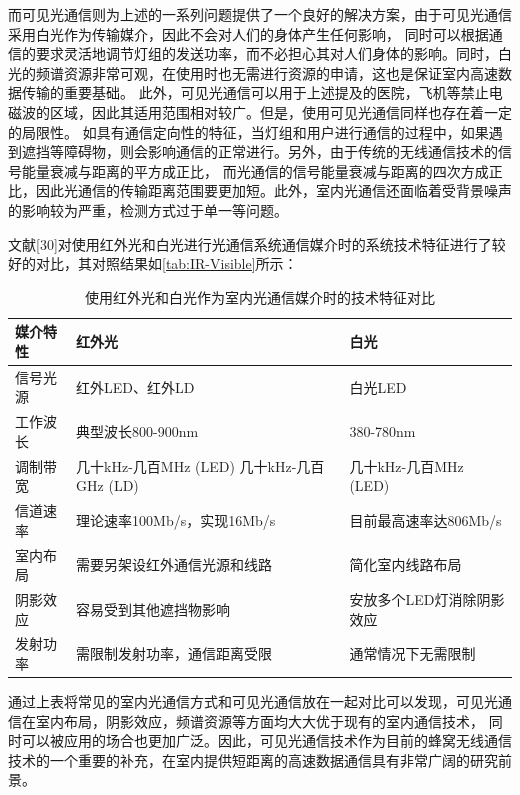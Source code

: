 而可见光通信则为上述的一系列问题提供了一个良好的解决方案，由于可见光通信采用白光作为传输媒介，因此不会对人们的身体产生任何影响，
同时可以根据通信的要求灵活地调节灯组的发送功率，而不必担心其对人们身体的影响。同时，白光的频谱资源非常可观，在使用时也无需进行资源的申请，这也是保证室内高速数据传输的重要基础。
此外，可见光通信可以用于上述提及的医院，飞机等禁止电磁波的区域，因此其适用范围相对较广。但是，使用可见光通信同样也存在着一定的局限性。
如具有通信定向性的特征，当灯组和用户进行通信的过程中，如果遇到遮挡等障碍物，则会影响通信的正常进行。另外，由于传统的无线通信技术的信号能量衰减与距离的平方成正比，
而光通信的信号能量衰减与距离的四次方成正比，因此光通信的传输距离范围要更加短。此外，室内光通信还面临着受背景噪声的影响较为严重，检测方式过于单一等问题。

文献[30]对使用红外光和白光进行光通信系统通信媒介时的系统技术特征进行了较好的对比，其对照结果如\autoref{tab:IR-Visible}所示：

\begin{table}[htbp]
    \caption{使用红外光和白光作为室内光通信媒介时的技术特征对比}
    \label{tab:IR-Visible}
    \centering
    \begin{tabular}{lll}
        \toprule
        媒介特性 & 红外光 & 白光\\
        \midrule
        信号光源 & 红外LED、红外LD & 白光LED \\
        工作波长 & 典型波长800-900nm & 380-780nm \\
        调制带宽 & 几十kHz-几百MHz (LED) 几十kHz-几百GHz (LD) & 几十kHz-几百MHz (LED) \\
        信道速率 & 理论速率100Mb/s，实现16Mb/s & 目前最高速率达806Mb/s \\
        室内布局 & 需要另架设红外通信光源和线路 & 简化室内线路布局 \\
        阴影效应 & 容易受到其他遮挡物影响 & 安放多个LED灯消除阴影效应 \\
        发射功率 & 需限制发射功率，通信距离受限 & 通常情况下无需限制 \\
        \bottomrule
    \end{tabular}
\end{table}

通过上表将常见的室内光通信方式和可见光通信放在一起对比可以发现，可见光通信在室内布局，阴影效应，频谱资源等方面均大大优于现有的室内通信技术，
同时可以被应用的场合也更加广泛。因此，可见光通信技术作为目前的蜂窝无线通信技术的一个重要的补充，在室内提供短距离的高速数据通信具有非常广阔的研究前景。


